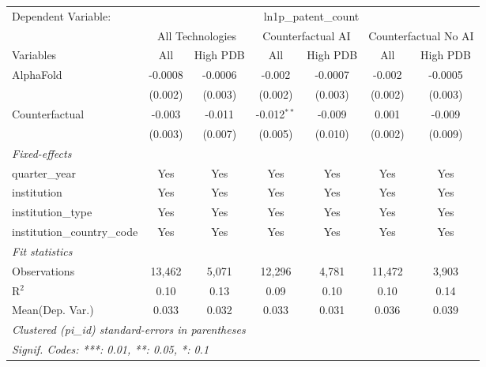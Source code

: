 \begingroup
\centering
\begin{tabular}{lcccccc}
   \tabularnewline \midrule \midrule
   Dependent Variable: & \multicolumn{6}{c}{ln1p\_patent\_count}\\
 & \multicolumn{2}{c}{All Technologies} & \multicolumn{2}{c}{Counterfactual AI} & \multicolumn{2}{c}{Counterfactual No AI} \\
\cmidrule(lr){1-1}\cmidrule(lr){2-3} \cmidrule(lr){4-5} \cmidrule(lr){6-7}
Variables & \multicolumn{1}{c}{All} & \multicolumn{1}{c}{High PDB} & \multicolumn{1}{c}{All} & \multicolumn{1}{c}{High PDB} & \multicolumn{1}{c}{All} & \multicolumn{1}{c}{High PDB} \\
\cmidrule(lr){1-1}\cmidrule(lr){2-2} \cmidrule(lr){3-3} \cmidrule(lr){4-4} \cmidrule(lr){5-5} \cmidrule(lr){6-6} \cmidrule(lr){7-7}
   AlphaFold                    & -0.0008 & -0.0006 & -0.002        & -0.0007 & -0.002  & -0.0005\\   
                                & (0.002) & (0.003) & (0.002)       & (0.003) & (0.002) & (0.003)\\   
   Counterfactual               & -0.003  & -0.011  & -0.012$^{**}$ & -0.009  & 0.001   & -0.009\\   
                                & (0.003) & (0.007) & (0.005)       & (0.010) & (0.002) & (0.009)\\   
   \midrule
   \emph{Fixed-effects}\\
   quarter\_year                & Yes     & Yes     & Yes           & Yes     & Yes     & Yes\\  
   institution                  & Yes     & Yes     & Yes           & Yes     & Yes     & Yes\\  
   institution\_type            & Yes     & Yes     & Yes           & Yes     & Yes     & Yes\\  
   institution\_country\_code   & Yes     & Yes     & Yes           & Yes     & Yes     & Yes\\  
   \midrule
   \emph{Fit statistics}\\
   Observations                 & 13,462  & 5,071   & 12,296        & 4,781   & 11,472  & 3,903\\  
   R$^2$                        & 0.10    & 0.13    & 0.09          & 0.10    & 0.10    & 0.14\\  
Mean(Dep. Var.) & 0.033 & 0.032 & 0.033 & 0.031 & 0.036 & 0.039 \\
   \midrule \midrule
   \multicolumn{7}{l}{\emph{Clustered (pi\_id) standard-errors in parentheses}}\\
   \multicolumn{7}{l}{\emph{Signif. Codes: ***: 0.01, **: 0.05, *: 0.1}}\\
\end{tabular}
\par\endgroup
